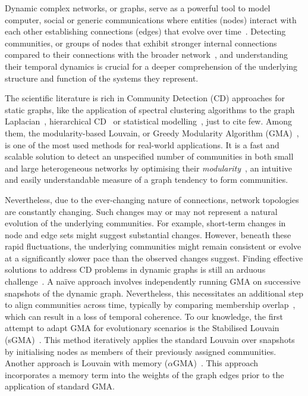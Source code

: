 \documentclass[letterpaper]{article}
\begin{document}
Dynamic complex networks, or graphs, serve as a powerful tool to model computer, social or generic communications where entities (nodes) interact with each other establishing connections (edges) that evolve over time~\cite{wang2019time,dakiche2019survey}. Detecting communities, or groups of nodes that exhibit stronger internal connections compared to their connections with the broader network~\cite{girvan2002community}, and understanding their temporal dynamics is crucial for a deeper comprehension of the underlying structure and function of the systems they represent.

The scientific literature is rich in Community Detection (CD) approaches for static graphs, like the application of spectral clustering algorithms to the graph Laplacian~\cite{ng2001spectral,dall2020spectral2}, hierarchical CD~\cite{li2022hierarchical} or statistical modelling~\cite{peixoto2019statistical,geng2019probabilistic}, just to cite few. Among them, the modularity-based Louvain, or Greedy Modularity Algorithm (GMA)~\cite{blondel2008louvain}, is one of the most used methods for real-world applications. It is a fast and scalable solution to detect an unspecified number of communities in both small and large heterogeneous networks by optimising their \emph{modularity}~\cite{newman2006modularity}, an intuitive and easily understandable measure of a graph tendency to form communities.


Nevertheless, due to the ever-changing nature of connections, network topologies are constantly changing. Such changes may or may not represent a natural evolution of the underlying communities. 
For example, short-term changes in node and edge sets might suggest substantial changes. However, beneath these rapid fluctuations, the underlying communities might remain consistent or evolve at a significantly slower pace than the observed changes suggest. Finding effective solutions to address CD problems in dynamic graphs is still an arduous challenge~\cite{dakiche2019survey}. A na\"ive approach involves independently running GMA on successive snapshots of the dynamic graph. Nevertheless, this necessitates an additional step to align communities across time, typically by comparing membership overlap~\cite{spiliopoulou2013monic}, which can result in a loss of temporal coherence.
To our knowledge, the first attempt to adapt GMA for evolutionary scenarios is the Stabilised Louvain (sGMA)~\cite{aynaud2010smoothed}. This method iteratively applies the standard Louvain over snapshots by initialising nodes as members of their previously assigned communities. Another approach is Louvain with memory ($\alpha$GMA)~\cite{elegazzar2021alpha}. This approach incorporates a memory term into the weights of the graph edges prior to the application of standard GMA.
\end{document}
